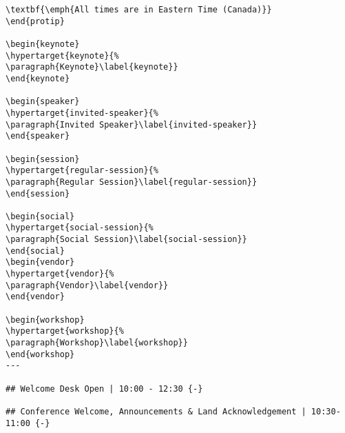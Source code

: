 \documentclass[
]{book}
\begin{document}
\begin{verbatim}
\textbf{\emph{All times are in Eastern Time (Canada)}}
\end{protip}

\begin{keynote}
\hypertarget{keynote}{%
\paragraph{Keynote}\label{keynote}}
\end{keynote}

\begin{speaker}
\hypertarget{invited-speaker}{%
\paragraph{Invited Speaker}\label{invited-speaker}}
\end{speaker}

\begin{session}
\hypertarget{regular-session}{%
\paragraph{Regular Session}\label{regular-session}}
\end{session}

\begin{social}
\hypertarget{social-session}{%
\paragraph{Social Session}\label{social-session}}
\end{social}
\begin{vendor}
\hypertarget{vendor}{%
\paragraph{Vendor}\label{vendor}}
\end{vendor}

\begin{workshop}
\hypertarget{workshop}{%
\paragraph{Workshop}\label{workshop}}
\end{workshop}
---

## Welcome Desk Open | 10:00 - 12:30 {-}

## Conference Welcome, Announcements & Land Acknowledgement | 10:30-11:00 {-}


\end{verbatim}
\end{document}
